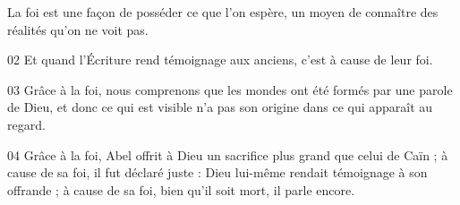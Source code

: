 La foi est une façon de posséder ce que l’on espère, un moyen de connaître des réalités qu’on ne voit pas.

02 Et quand l’Écriture rend témoignage aux anciens, c’est à cause de leur foi.

03 Grâce à la foi, nous comprenons que les mondes ont été formés par une parole de Dieu, et donc ce qui est visible n’a pas son origine dans ce qui apparaît au regard.

04 Grâce à la foi, Abel offrit à Dieu un sacrifice plus grand que celui de Caïn ; à cause de sa foi, il fut déclaré juste : Dieu lui-même rendait témoignage à son offrande ; à cause de sa foi, bien qu’il soit mort, il parle encore.
